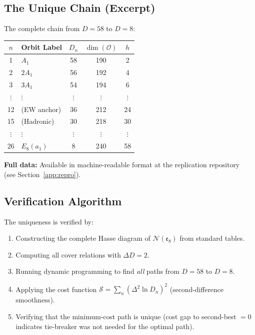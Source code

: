 \subsection{The Unique Chain (Excerpt)}

The complete chain from $D = 58$ to $D = 8$:

\begin{center}
\small
\begin{tabular}{@{}clccc@{}}
\toprule
$n$ & \textbf{Orbit Label} & $D_n$ & $\dim(\mathcal{O})$ & $h$\\
\midrule
1 & $A_1$ & 58 & 190 & 2\\
2 & $2A_1$ & 56 & 192 & 4\\
3 & $3A_1$ & 54 & 194 & 6\\
$\vdots$ & $\vdots$ & $\vdots$ & $\vdots$ & $\vdots$\\
12 & (EW anchor) & 36 & 212 & 24\\
15 & (Hadronic) & 30 & 218 & 30\\
$\vdots$ & $\vdots$ & $\vdots$ & $\vdots$ & $\vdots$\\
26 & $E_8(a_1)$ & 8 & 240 & 58\\
\bottomrule
\end{tabular}
\end{center}

\textbf{Full data:} Available in machine-readable format at the replication repository 
(see Section~\ref{app:repro}).

\subsection{Verification Algorithm}

The uniqueness is verified by:
\begin{enumerate}[leftmargin=1.5em, topsep=2pt, itemsep=1pt]
    \item Constructing the complete Hasse diagram of $\mathcal{N}(\mathfrak{e}_8)$ 
        from standard tables.
    \item Computing all cover relations with $\Delta D = 2$.
    \item Running dynamic programming to find \emph{all} paths from $D = 58$ to $D = 8$.
    \item Applying the cost function $\mathcal{S} = \sum_n (\Delta^2 \ln D_n)^2$ 
        (second-difference smoothness).
    \item Verifying that the minimum-cost path is unique (cost gap to second-best $= 0$ 
        indicates tie-breaker was not needed for the optimal path).
\end{enumerate}

